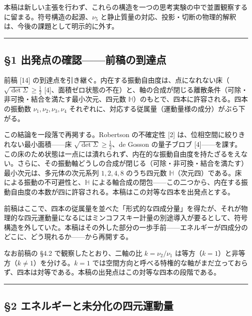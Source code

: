 \documentclass[
]{ltjsarticle}
\begin{document}
本稿は新しい主張を行わず、これらの構造を一つの思考実験の中で並置観察するに留まる。符号構造の起源、\(\nu_5\)
と静止質量の対応、投影・切断の物理的解釈は、今後の課題として明示的に外す。

\begin{center}\rule{0.5\linewidth}{0.5pt}\end{center}

\subsection{§1
出発点の確認------前稿の到達点}\label{ux51faux767aux70b9ux306eux78baux8a8dux524dux7a3fux306eux5230ux9054ux70b9}

前稿 {[}14{]}
の到達点を引き継ぐ。内在する振動自由度は、点になれない床（\(\sqrt{\det\Sigma}\ge\tfrac12\)
{[}4{]}、面積ゼロ状態の不在）と、軸の合成が閉じる離散条件（可除・非可換・結合を満たす最小次元、四元数
\(\mathbb{H}\)）のもとで、四本に許容される。四本の振動数
\(\nu_1,\nu_2,\nu_3,\nu_4\)
それぞれに、対応する従属量（運動量様の成分）がぶら下がる。

この結論を一段落で再掲する。Robertson の不確定性 {[}2{]}
は、位相空間に絞りきれない最小面積------床
\(\sqrt{\det\Sigma}\ge\tfrac12\)、de Gosson の量子ブロブ
{[}4{]}------を課す。この床のため状態は一点には潰れられず、内在的な振動自由度を持たざるをえない。さらに、その振動軸どうしの合成が閉じる（可除・非可換・結合を満たす）最小次元は、多元体の次元系列
\(1,2,4,8\) のうち四元数
\(\mathbb{H}\)（次元四）である。床による振動の不可避性と、\(\mathbb{H}\)
による軸合成の閉包------この二つから、内在する振動自由度の本数が四に許容される。本稿はこの対等な四本を出発点とする。

前稿はここで、四本の従属量を並べた「形式的な四成分量」を得たが、それが物理的な四元運動量になるにはミンコフスキー計量の別途導入が要るとして、符号構造を外していた。本稿はその外した部分の一歩手前------エネルギーが四成分のどこに、どう現れるか------から再開する。

なお前稿の §4.2 で観察したとおり、二軸の比 \(k=\nu_2/\nu_1\)
は等方（\(k=1\)）と非等方（\(k\neq1\)）を分ける。\(k=1\)
では空間方向と呼べる特権的な軸がまだ立っておらず、四本は対等である。本稿の出発点はこの対等な四本の段階である。

\begin{center}\rule{0.5\linewidth}{0.5pt}\end{center}

\subsection{§2
エネルギーと未分化の四元運動量}\label{ux30a8ux30cdux30ebux30aeux30fcux3068ux672aux5206ux5316ux306eux56dbux5143ux904bux52d5ux91cf}
\end{document}
